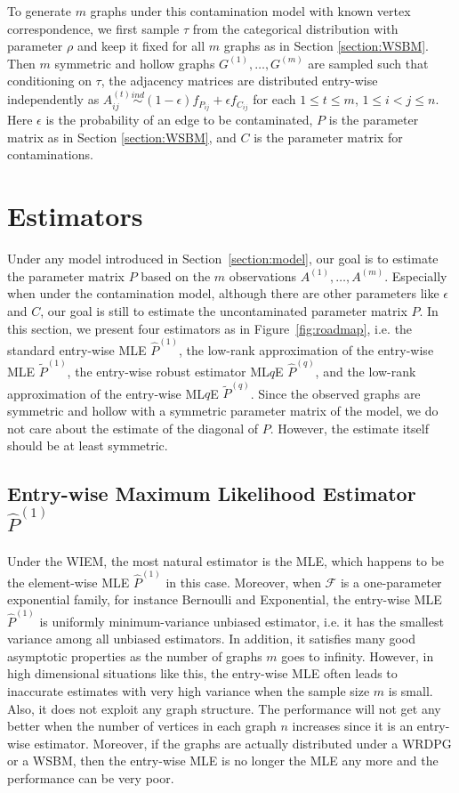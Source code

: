 \documentclass[a4paper]{article}
\renewcommand{\hat}{\widehat}
\begin{document}
To generate $m$ graphs under this contamination model with known vertex correspondence, we first sample $\tau$ from the categorical distribution with parameter $\rho$ and keep it fixed for all $m$ graphs as in Section \ref{section:WSBM}. Then $m$ symmetric and hollow graphs $G^{(1)}, \dotsc, G^{(m)}$ are sampled such that conditioning on $\tau$, the adjacency matrices are distributed entry-wise independently as $A^{(t)}_{ij} \stackrel{ind}{\sim} (1-\epsilon) f_{P_{ij}} + \epsilon f_{C_{ij}}$ for each $1 \le t \le m$, $1 \le i < j \le n$. Here $\epsilon$ is the probability of an edge to be contaminated, $P$ is the parameter matrix as in Section \ref{section:WSBM}, and $C$ is the parameter matrix for contaminations.



\section{Estimators}
\label{section:estimators}
Under any model introduced in Section~\ref{section:model}, our goal is to estimate the parameter matrix $P$ based on the $m$ observations $A^{(1)}, \dotsc, A^{(m)}$. Especially when under the contamination model, although there are other parameters like $\epsilon$ and $C$, our goal is still to estimate the uncontaminated parameter matrix $P$. In this section, we present four estimators as in Figure~\ref{fig:roadmap}, i.e. the standard entry-wise MLE $\hat{P}^{(1)}$, the low-rank approximation of the entry-wise MLE $\widetilde{P}^{(1)}$, the entry-wise robust estimator ML$q$E $\hat{P}^{(q)}$, and the low-rank approximation of the entry-wise ML$q$E $\widetilde{P}^{(q)}$. Since the observed graphs are symmetric and hollow with a symmetric parameter matrix of the model, we do not care about the estimate of the diagonal of $P$. However, the estimate itself should be at least symmetric.

\subsection{Entry-wise Maximum Likelihood Estimator $\hat{P}^{(1)}$}

Under the WIEM, the most natural estimator is the MLE, which happens to be the element-wise MLE $\hat{P}^{(1)}$ in this case.
Moreover, when $\mathcal{F}$ is a one-parameter exponential family, for instance Bernoulli and Exponential, the entry-wise MLE $\hat{P}^{(1)}$ is uniformly minimum-variance unbiased estimator, i.e. it has the smallest variance among all unbiased estimators. In addition, it satisfies many good asymptotic properties as the number of graphs $m$ goes to infinity.
However, in high dimensional situations like this, the entry-wise MLE often leads to inaccurate estimates with very high variance when the sample size $m$ is small. Also, it does not exploit any graph structure. The performance will not get any better when the number of vertices in each graph $n$ increases since it is an entry-wise estimator. Moreover, if the graphs are actually distributed under a WRDPG or a WSBM, then the entry-wise MLE is no longer the MLE any more and the performance can be very poor.
\end{document}

